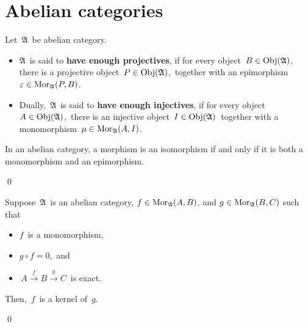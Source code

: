 

\section{Abelian categories}
\setcounter{theorem}{0}
\setcounter{equation}{0}


\renewcommand{\theenumi}{\roman{enumi}}
\renewcommand{\labelenumi}{\textnormal{(\theenumi)}$\;\;$}


\begin{definition}
\mbox{}
\vskip 0.1cm
\noindent
Let \,$\mathfrak{A}$\, be abelian category.
\begin{itemize}
\item
	$\mathfrak{A}$\, is said to \textbf{have enough projectives},
	if for every object \,$B \in \textnormal{Obj}(\mathfrak{A})$,\,
	there is a projective object \,$P \in \textnormal{Obj}(\mathfrak{A})$,\,
	together with an epimorphism \,$\varepsilon \in \textnormal{Mor}_{\mathfrak{A}}(P,B)$.
\item	
	Dually, \,$\mathfrak{A}$\, is said to \textbf{have enough injectives},
	if for every object \,$A \in \textnormal{Obj}(\mathfrak{A})$,\,
	there is an injective object \,$I \in \textnormal{Obj}(\mathfrak{A})$\,
	together with a monomorphism \,$\mu \in \textnormal{Mor}_{\mathfrak{A}}(A,I)$.
\end{itemize}
\end{definition}


\vskip 0.5cm
\begin{proposition}
\mbox{}
\vskip 0.1cm
\noindent
In an abelian category, a morphism is an isomorphism if and only if
it is both a monomorphism and an epimorphism.
\end{proposition}
\proof

\qed


\begin{proposition}\label{MonomorphicFirstFactorInExactSequenceIsKernelOfSecondFactor}
\mbox{}
\vskip 0.1cm
\noindent
Suppose \,$\mathfrak{A}$\, is an abelian category,
$f \in \textnormal{Mor}_{\mathfrak{A}}(A,B)$, and $g \in \textnormal{Mor}_{\mathfrak{A}}(B,C)$
such that
\begin{itemize}
\item
	$f$\, is a monomorphism,
\item
	$g \circ f = 0$,\, and
\item
	\,$A \overset{f}{\longrightarrow} B \overset{g}{\longrightarrow} C$\,
	is exact.
\end{itemize}
Then, \,$f$\, is a kernel of \,$g$.
\end{proposition}
\proof

\qed

